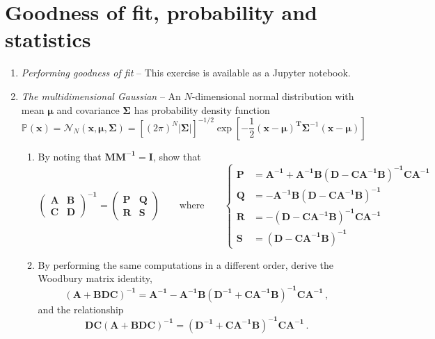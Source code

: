 \documentclass[a4paper,11pt]{article}
\begin{document}
\section{Goodness of fit, probability and statistics}
\begin{enumerate}[resume]
\item \textit{Performing goodness of fit }\label{q:mfit} -- This exercise is available as a Jupyter notebook.

\item \textit{The multidimensional Gaussian}\label{q:mdgauss} -- 
An $N$-dimensional normal distribution with mean $\boldsymbol{\mu}$ and covariance $\boldsymbol{\Sigma}$ has probability density function
\[\mathbb{P}(\mathbf{x})=\mathcal{N}_N(\mathbf{x},\boldsymbol{\mu},\boldsymbol{\Sigma}) = \left[\left(2\pi\right)^{N} |\boldsymbol{\Sigma}|\right]^{-1/2}\exp\left[-\frac{1}{2}\left(\mathbf{x}-\boldsymbol\mu\right)^\mathbf{T}\boldsymbol\Sigma^{-1}\left(\mathbf{x}-\boldsymbol{\mu}\right)\right]\]
\begin{enumerate}
\item By noting that $\mathbf{MM^{-1}}=\mathbf{I}$, show that\[\left(\begin{array}{cc}\mathbf{A}& \mathbf{B}\\\mathbf{C}&\mathbf{D}\end{array}\right)^\mathbf{-1}=\left(\begin{array}{cc}\mathbf{P}& \mathbf{Q}\\\mathbf{R}&\mathbf{S}\end{array}\right)\quad\quad\textrm{where}\quad\quad\begin{cases}\mathbf{P} &= \mathbf{A^{-1}}+\mathbf{A^{-1}B(D-CA^{-1}B)^{-1}CA^{-1}}\\
\mathbf{Q}&=-\mathbf{A^{-1}B(D-CA^{-1}B)^{-1}}\\
\mathbf{R}&=-\mathbf{(D-CA^{-1}B)^{-1}CA^{-1}}\\
\mathbf{S}&=\mathbf{(D-CA^{-1}B)^{-1}}\end{cases}\]
\item \label{q:woodbury} By performing the same computations in a different order, derive the Woodbury matrix identity,
\[\left(\mathbf{A+BDC}\right)^\mathbf{-1} = \mathbf{A^{-1}} - \mathbf{A^{-1}B}\left(\mathbf{D^{-1}}+\mathbf{CA^{-1}B}\right)^\mathbf{-1}\mathbf{CA^{-1}}\,,\]
and the relationship
\[\mathbf{DC(A+BDC)^{-1}} = \mathbf{{(D^{-1}+CA^{-1}B)}^{-1}CA^{-1}}\,.\]


\end{enumerate}
\end{enumerate}
\end{document}

